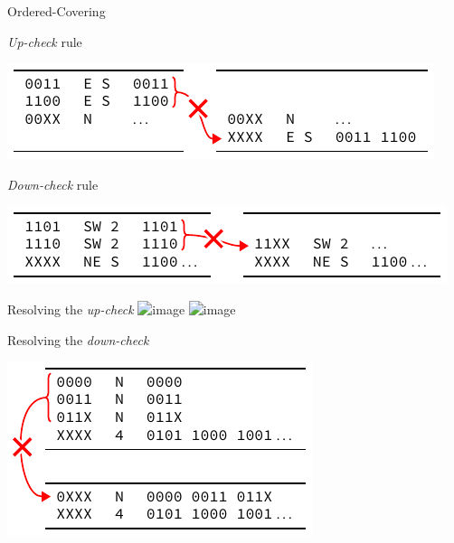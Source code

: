 \documentclass[t]{beamer}
\begin{document}
\begin{frame}{Ordered-Covering}

\end{frame}

\begin{frame}{\emph{Up-check} rule}
  \begin{center}
    \includegraphics{../figures/rule2a_example}
  \end{center}
\end{frame}

\begin{frame}{\emph{Down-check} rule}
  \begin{center}
    \includegraphics{../figures/rule2b_example}
  \end{center}
\end{frame}

\begin{frame}{Resolving the \emph{up-check}}
  \includegraphics<1>{../figures/upcheck_resolve_example_1}
  \includegraphics<2>{../figures/upcheck_resolve_example_2}
\end{frame}

\begin{frame}{Resolving the \emph{down-check}}
  \begin{center}
    \includegraphics{../figures/downcheck_resolve_example_1}
  \end{center}
\end{frame}
\end{document}
